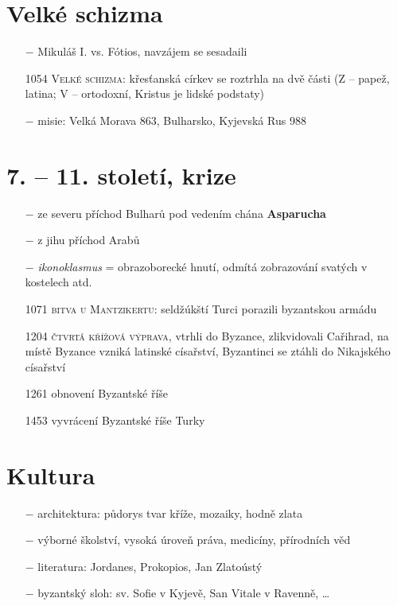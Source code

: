 \documentclass{article}
\begin{document}
\section*{Velké schizma}
\begin{itemize}
    \vspace{-0.5em}
    \setlength\itemsep{0.15em}
    \item[$-$] Mikuláš I. vs. Fótios, navzájem se sesadaili
    \item[1054] \textsc{Velké schizma}: křesťanská církev se roztrhla na dvě části (Z -- papež, latina; V -- ortodoxní, Kristus je lidské podstaty)
    \item[$-$] misie: Velká Morava 863, Bulharsko, Kyjevská Rus 988
\end{itemize}

\section*{7. -- 11. století, krize}
\begin{itemize}
    \vspace{-0.5em}
    \setlength\itemsep{0.15em}
    \item[$-$] ze severu příchod Bulharů pod vedením chána \textbf{Asparucha}
    \item[$-$] z jihu příchod Arabů
    \item[$-$] \textit{ikonoklasmus} = obrazoborecké hnutí, odmítá zobrazování svatých v kostelech atd.
    \item[1071] \textsc{bitva u Mantzikertu}: seldžúkští Turci porazili byzantskou armádu
    \item[1204] \textsc{čtvrtá křížová výprava}, vtrhli do Byzance, zlikvidovali Cařihrad, na místě Byzance vzniká latinské císařství, Byzantinci se ztáhli do Nikajského císařství
    \item[1261] obnovení Byzantské říše
    \item[1453] vyvrácení Byzantské říše Turky
\end{itemize}

\section*{Kultura}
\begin{itemize}
    \vspace{-0.5em}
    \setlength\itemsep{0.15em}
    \item[$-$] architektura: půdorys tvar kříže, mozaiky, hodně zlata
    \item[$-$] výborné školství, vysoká úroveň práva, medicíny, přírodních věd
    \item[$-$] literatura: Jordanes, Prokopios, Jan Zlatoústý
    \item[$-$] byzantský sloh: sv. Sofie v Kyjevě, San Vitale v Ravenně, \dots
\end{itemize}
\end{document}
